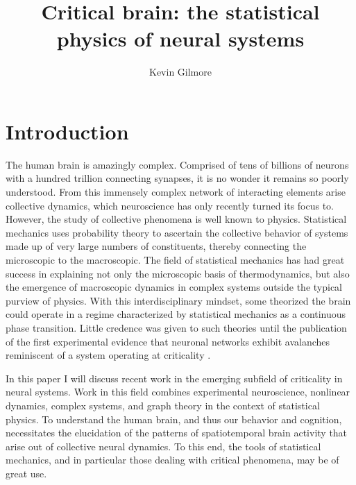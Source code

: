 \documentclass[12pt]{article}
\title{Critical brain: the statistical physics of neural systems}
\author
{Kevin Gilmore}
\newenvironment{sciabstract}{%
\begin{quote} \bf}
{\end{quote}}
\begin{document}
 


\baselineskip24pt


\maketitle 




\begin{sciabstract}

\end{sciabstract}


\section*{Introduction}

The human brain is amazingly complex. Comprised of tens of billions of neurons with a hundred trillion connecting synapses, it is no wonder it remains so poorly understood. From this immensely complex network of interacting elements arise collective dynamics, which neuroscience has only recently turned its focus to. However, the study of collective phenomena is well known to physics. Statistical mechanics uses probability theory to ascertain the collective behavior of systems made up of very large numbers of constituents, thereby connecting the microscopic to the macroscopic. The field of statistical mechanics has had great success in explaining not only the microscopic basis of thermodynamics, but also the emergence of macroscopic dynamics in complex systems outside the typical purview of physics. With this interdisciplinary mindset, some theorized the brain could operate in a regime characterized by statistical mechanics as a continuous phase transition\cite{Bak1987a}. Little credence was given to such theories until the publication of the first experimental evidence that neuronal networks exhibit avalanches reminiscent of a system operating at criticality \cite{Beggs2003b}.

In this paper I will discuss recent work in the emerging subfield of criticality in neural systems. Work in this field combines experimental neuroscience, nonlinear dynamics, complex systems, and graph theory in the context of statistical physics. To understand the human brain, and thus our behavior and cognition, necessitates the elucidation of the patterns of spatiotemporal brain activity that arise out of collective neural dynamics. To this end, the tools of statistical mechanics, and in particular those dealing with critical phenomena, may be of great use.
\end{document}
